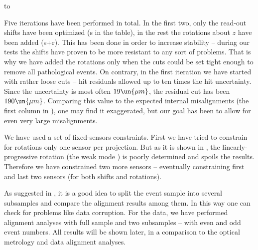 \hbox to

\noindent Five iterations have been performed in total. In the first two, only the read-out shifts have been optimized (s in the table), in the rest the rotations about $z$ have been added (s+r). This has been done in order to increase stability -- during our  tests the shifts have proven to be more resistant to any sort of problems. That is why we have added the rotations only when the cuts could be set tight enough to remove all pathological events. On contrary, in the first iteration we have started with rather loose cuts -- hit residuals allowed up to ten times the hit uncertainty. Since the uncertainty is most often $19\un{\mu m}$, the residual cut has been $190\un{\mu m}$. Comparing this value to the expected internal misalignments (the first column in ), one may find it exaggerated, but our goal has been to allow for even very large misalignments.


We have used a set of fixed-sensors constraints. First we have tried to constrain for rotations only one sensor per projection. But as it is shown in , the linearly-progressive rotation (the weak mode ) is poorly determined and spoils the results. Therefore we have constrained two more sensors -- eventually constraining first and last two sensors (for both shifts and rotations).


As suggested in , it is a good idea to split the event sample into several subsamples and compare the alignment results among them. In this way one can check for problems like data corruption. For the  data, we have performed alignment analyses with full sample and two subsamples -- with even and odd event numbers. All results will be shown later, in a comparison to the optical metrology and  data alignment analyses.


